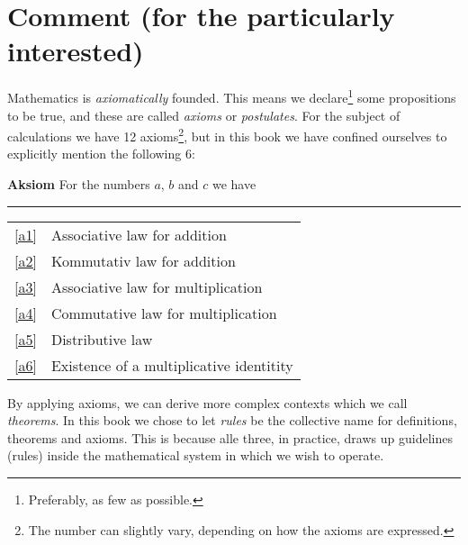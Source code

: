 



	
\section*{Comment (for the particularly interested) \label{Kommentar1}}
Mathematics is \textit{axiomatically} founded. This means we declare\footnote{Preferably, as few as possible.} some propositions to be true, and these are called \textit{axioms} or \textit{postulates}. For the subject of calculations we have 12 axioms\footnote{The number can slightly vary, depending on how the axioms are expressed.}, but in this book we have confined ourselves to explicitly mention the following 6:
\regv 

\begin{tcolorbox}[boxrule=0.3 mm,arc=0mm,colback=blue!5] {\large \textbf{Aksiom} \vspace{5 pt}}\newline
For the numbers $ a $, $ b $ and $ c $ we have
\rule{1\linewidth}{0.75bp}
\begin{center}
	\begin{tabular}{rl}
		\eqref{a1} &Associative law for addition\\
		\eqref{a2} & Kommutativ law for addition \\	
		\eqref{a3} & Associative law for multiplication \\
		\eqref{a4} & Commutative law for multiplication \\		
		\eqref{a5} & Distributive law\\	
		\eqref{a6} & Existence of a multiplicative identitity
	\end{tabular}
\end{center}
\end{tcolorbox}
\vsk
By applying axioms, we can derive more complex contexts which we call \textit{theorems}. In this book we chose to let \textsl{rules} be the collective name for definitions, theorems and axioms. This is because alle three, in practice, draws up guidelines (rules) inside the mathematical system in which we wish to operate.\vsk
